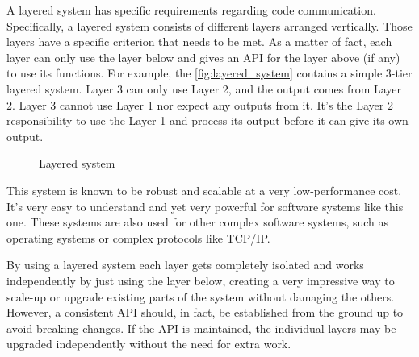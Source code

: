 A layered system has specific requirements regarding code communication. Specifically, a layered system consists
of different layers arranged vertically. Those layers have a specific criterion that needs to be met. As a matter of fact,
each layer can only use the layer below and gives an API for the layer above (if any) to use its functions. For example,
the \autoref{fig:layered_system} contains a simple 3-tier layered system. Layer 3 can only use Layer 2, and the output comes
from Layer 2. Layer 3 cannot use Layer 1 nor expect any outputs from it. It's the Layer 2 responsibility to use the Layer 1
and process its output before it can give its own output.

\begin{figure}[H]
    \centering

    \caption{Layered system}
    \label{fig:layered_system}
\end{figure}

This system is known to be robust and scalable at a very low-performance cost. It's very easy to understand and yet very powerful
for software systems like this one. These systems are also used for other complex software systems, such as operating
systems or complex protocols like TCP/IP.

By using a layered system each layer gets completely isolated and works independently by just using the layer below,
creating a very impressive way to scale-up or upgrade existing parts of the system without damaging the others.
However, a consistent API should, in fact, be established from the ground up to avoid breaking changes.
If the API is maintained, the individual layers may be upgraded independently without the need for extra work.

